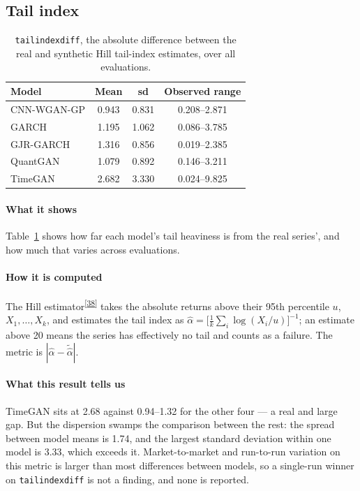 \documentclass[11pt,a4paper]{article}
\makeatletter
\newcommand{\tcite}[1]{\textsuperscript{[\hyperlink{R:#1}{#1}]}}
\DeclareRobustCommand{\_}{\ifmmode\nfss@text{\textunderscore}\else\textunderscore\allowbreak\fi}
\makeatother
\begin{document}
\subsection{Tail index}
\label{sec:tail}

\begin{table}[htbp]
\centering
\caption{\texttt{tail\_index\_diff}, the absolute difference between the real and synthetic Hill tail-index estimates, over all evaluations.}
\label{tab:tail}
\begin{tabular}{@{}lccc@{}}
\toprule
Model & Mean & sd & Observed range \\
\midrule
CNN-WGAN-GP & 0.943 & 0.831 & 0.208--2.871 \\
GARCH & 1.195 & 1.062 & 0.086--3.785 \\
GJR-GARCH & 1.316 & 0.856 & 0.019--2.385 \\
QuantGAN & 1.079 & 0.892 & 0.146--3.211 \\
TimeGAN & 2.682 & 3.330 & 0.024--9.825 \\
\bottomrule
\end{tabular}
\end{table}

\paragraph{What it shows} Table~\ref{tab:tail} shows how far each model's tail heaviness is from the real series', and how much that varies across evaluations.

\paragraph{How it is computed} The Hill estimator\tcite{38} takes the absolute returns above their 95th percentile $u$, $X_1,\dots,X_k$, and estimates the tail index as $\hat\alpha=\big[\frac1k\sum_i\log(X_i/u)\big]^{-1}$; an estimate above 20 means the series has effectively no tail and counts as a failure. The metric is $|\hat\alpha-\tilde{\hat\alpha}|$.

\paragraph{What this result tells us} TimeGAN sits at 2.68 against 0.94--1.32 for the other four --- a real and large gap. But the dispersion swamps the comparison between the rest: the spread between model means is 1.74, and the largest standard deviation within one model is 3.33, which exceeds it. Market-to-market and run-to-run variation on this metric is larger than most differences between models, so a single-run winner on \texttt{tail\_index\_diff} is not a finding, and none is reported.
\end{document}
